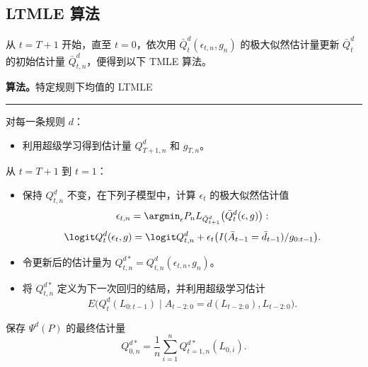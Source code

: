 \subsection{LTMLE 算法}
\label{subsec:ch04-algorithm}

从 $t=T+1$ 开始，直至 $t=0$，依次用 $\bar Q_t^d(\epsilon_{t,n},g_n)$ 的极大似然估计量更新 $\bar Q_t^d$ 的初始估计量 $\bar Q_{t,n}^d$，便得到以下 TMLE 算法。

\begin{sourcebox}
\textbf{算法。}\quad 特定规则下均值的 LTMLE\par
\smallskip\hrule\smallskip
对每一条规则 $d$：
\begin{itemize}[label=$\star$,leftmargin=1.7em,itemsep=.3em]
 \item 利用超级学习得到估计量 $Q_{T+1,n}^d$ 和 $g_{T,n}$。
\end{itemize}
\hspace*{1.7em}从 $t=T+1$ 到 $t=1$：
\begin{itemize}[label=$\star$,leftmargin=3.4em,itemsep=.3em]
 \item 保持 $Q_{t,n}^d$ 不变，在下列子模型中，计算 $\epsilon_t$ 的极大似然估计值
 \[
  \epsilon_{t,n}
  =\argmin_\epsilon P_nL_{\bar Q_{t+1}^d}\bigl(\bar Q_t^d(\epsilon,g)\bigr):
 \]
 \[
  \logit Q_t^d(\epsilon_t,g)
  =\logit Q_{t,n}^d
  +\epsilon_t\bigl(I(\bar A_{t-1}=\bar d_{t-1})/g_{0:t-1}\bigr).
 \]
 \item 令更新后的估计量为 $Q_{t,n}^{d*}=Q_{t,n}^d(\epsilon_{t,n},g_n)$。
 \item 将 $Q_{t,n}^{d*}$ 定义为下一次回归的结局，并利用超级学习估计
 \[
  E\bigl(Q_t^d(L_{0:t-1})\mid
   A_{t-2:0}=d(L_{t-2:0}),L_{t-2:0}\bigr).
 \]
\end{itemize}
保存 $\Psi^d(P)$ 的最终估计量
\[
 Q_{0,n}^{d*}=\frac1n\sum_{i=1}^nQ_{t=1,n}^{d*}(L_{0,i}).
\]
\end{sourcebox}

